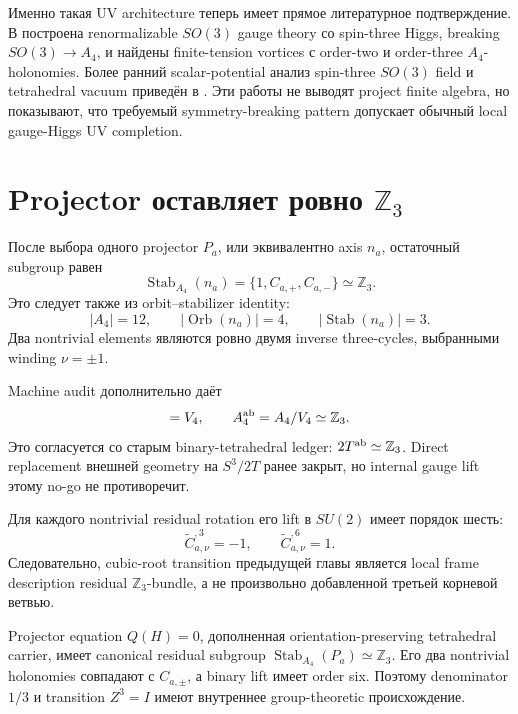 Именно такая UV architecture теперь имеет прямое литературное
подтверждение. В  построена renormalizable
\(SO(3)\) gauge theory со spin-three Higgs, breaking
\(SO(3)\to A_4\), и найдены finite-tension vortices с order-two и
order-three \(A_4\)-holonomies. Более ранний scalar-potential анализ
spin-three \(SO(3)\) field и tetrahedral vacuum приведён в
. Эти работы не выводят project finite algebra, но
показывают, что требуемый symmetry-breaking pattern допускает обычный
local gauge-Higgs UV completion.

\section{Projector оставляет ровно \texorpdfstring{\(\mathbb Z_3\)}{Z3}}

После выбора одного projector \(P_a\), или эквивалентно axis \(n_a\),
остаточный subgroup равен
\begin{equation}
 \operatorname{Stab}_{A_4}(n_a)
 =\{1,C_{a,+},C_{a,-}\}
 \simeq\mathbb Z_3.
 \label{eq:projector-z3-stabilizer}
\end{equation}
Это следует также из orbit--stabilizer identity:
\begin{equation}
 |A_4|=12,
 \qquad
 |\operatorname{Orb}(n_a)|=4,
 \qquad
 |\operatorname{Stab}(n_a)|=3.
\end{equation}
Два nontrivial elements являются ровно двумя inverse three-cycles,
выбранными winding \(\nu=\pm1\).

Machine audit дополнительно даёт
\begin{equation}
 [A_4,A_4]=V_4,
 \qquad
 A_4^{\rm ab}=A_4/V_4\simeq\mathbb Z_3.
\end{equation}
Это согласуется со старым binary-tetrahedral ledger:
\(2T^{\rm ab}\simeq\mathbb Z_3\). Direct replacement внешней geometry на
\(S^3/2T\) ранее закрыт, но internal gauge lift этому no-go не
противоречит.

Для каждого nontrivial residual rotation его lift в \(SU(2)\) имеет
порядок шесть:
\begin{equation}
 \widetilde C_{a,\nu}^{,3}=-1,
 \qquad
 \widetilde C_{a,\nu}^{,6}=1.
 \label{eq:binary-z6-lift}
\end{equation}
Следовательно, cubic-root transition предыдущей главы является local
frame description residual \(\mathbb Z_3\)-bundle, а не произвольно
добавленной третьей корневой ветвью.

\begin{theorem}
Projector equation \(Q(H)=0\), дополненная orientation-preserving
tetrahedral carrier, имеет canonical residual subgroup
\(\operatorname{Stab}_{A_4}(P_a)\simeq\mathbb Z_3\). Его два nontrivial
holonomies совпадают с \(C_{a,\pm}\), а binary lift имеет order six.
Поэтому denominator \(1/3\) и transition \(Z^3=I\) имеют внутреннее
group-theoretic происхождение.
\end{theorem}

